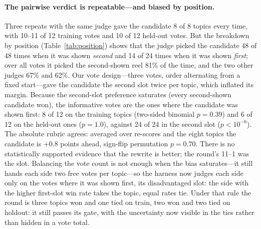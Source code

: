 \documentclass[11pt]{article}
\begin{document}
\paragraph{The pairwise verdict is repeatable---and biased by position.} Three repeats with the same
judge gave the candidate 8 of 8 topics every time, with 10--11 of 12 training votes and 10 of 12
held-out votes. But the breakdown by position (Table~\ref{tab:position}) shows that the judge picked
the candidate 48 of 48 times when it was shown \emph{second} and 14 of 24 times when it was shown
\emph{first}; over all votes it picked the second-shown reel 81\% of the time, and the two other judges
67\% and 62\%. Our vote design---three votes, order alternating from a fixed start---gave the candidate the second
slot twice per topic, which inflated its margin. Because the second-slot preference saturates (every
second-shown candidate won), the informative votes are the ones where the candidate was shown first:
8 of 12 on the training topics (two-sided binomial $p=0.39$) and 6 of 12 on the held-out ones
($p=1.0$), against 24 of 24 in the second slot ($p<10^{-6}$). The absolute rubric agrees: averaged
over re-scores and the eight topics the candidate is $+0.8$ points ahead, sign-flip permutation
$p=0.70$. There is no statistically supported evidence that the rewrite is better; the round's 11--1
was the slot. Balancing the vote count is not enough when the bias saturates---it still hands each side
two free votes per topic---so the harness now judges each side only on the votes where it was shown
first, its disadvantaged slot: the side with the higher first-slot win rate takes the topic, equal rates
tie. Under that rule the round is three topics won and one tied on train, two won and two tied on
holdout: it still passes its gate, with the uncertainty now visible in the ties rather than hidden in a
vote total.
\end{document}
